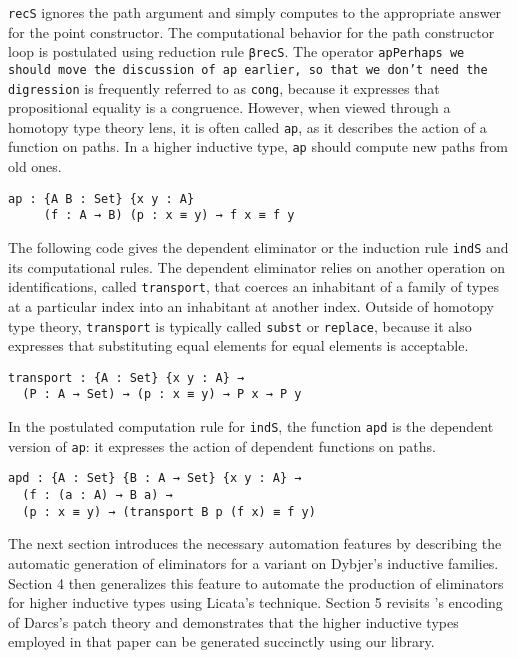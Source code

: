 \documentclass[sigplan,10pt]{acmart}
\begin{document}
{\tt recS} ignores the path argument and simply computes to the appropriate answer for the point constructor. The computational behavior for the path constructor loop is postulated using reduction rule {\tt βrecS}.
The operator \texttt{ap}\texttt{Perhaps we should move the discussion of ap earlier, so that we don't need the digression} is frequently referred to as \texttt{cong}, because it expresses that propositional equality is a congruence.
However, when viewed through a homotopy type theory lens, it is often called \texttt{ap}, as it describes the action of a function on paths.
In a higher inductive type, \texttt{ap} should compute new paths from old ones.
\begin{center}
\begin{BVerbatim}
ap : {A B : Set} {x y : A}
     (f : A → B) (p : x ≡ y) → f x ≡ f y
\end{BVerbatim}
\end{center}

The following code gives the dependent eliminator or the induction rule {\tt indS} and its computational rules.
The dependent eliminator relies on another operation on identifications, called \texttt{transport}, that coerces an inhabitant of a family of types at a particular index into an inhabitant at another index.
Outside of homotopy type theory, \texttt{transport} is typically called \texttt{subst} or \texttt{replace}, because it also expresses that substituting equal elements for equal elements is acceptable.
\begin{center}
\begin{Verbatim}
transport : {A : Set} {x y : A} → 
  (P : A → Set) → (p : x ≡ y) → P x → P y
\end{Verbatim}

\end{center}


In the postulated computation rule for \texttt{indS}, the function {\tt apd} is the dependent version of \texttt{ap}: it expresses the action of dependent functions on paths.
\begin{center}
\begingroup
\begin{Verbatim}
apd : {A : Set} {B : A → Set} {x y : A} → 
  (f : (a : A) → B a) → 
  (p : x ≡ y) → (transport B p (f x) ≡ f y)
\end{Verbatim}
\endgroup
\end{center}

The next section introduces the necessary automation features by describing the automatic generation of eliminators for a variant on Dybjer's inductive families. Section 4 then generalizes this feature to automate the production of eliminators for higher inductive types using Licata's technique. Section 5 revisits \citeauthor{Angiuli-2014}'s encoding of Darcs's patch theory \citep{Angiuli-2014} and demonstrates that the higher inductive types employed in that paper can be generated succinctly using our library.
\end{document}
